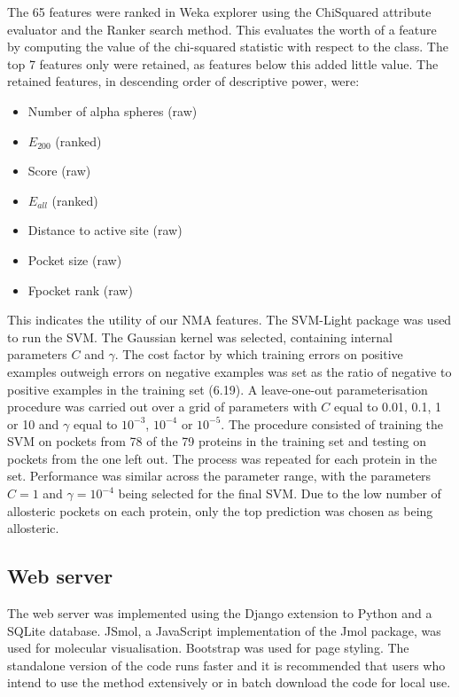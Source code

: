 The 65 features were ranked in Weka explorer \cite{Frank2004} using the ChiSquared attribute evaluator and the Ranker search method.
This evaluates the worth of a feature by computing the value of the chi-squared statistic with respect to the class.
The top 7 features only were retained, as features below this added little value.
The retained features, in descending order of descriptive power, were:
\begin{itemize}
\item Number of alpha spheres (raw)
\item $E_{200}$ (ranked)
\item Score (raw)
\item $E_{all}$ (ranked)
\item Distance to active site (raw)
\item Pocket size (raw)
\item Fpocket rank (raw)
\end{itemize}

This indicates the utility of our NMA features.
The SVM-Light package \cite{Joachims1998} was used to run the SVM.
The Gaussian kernel was selected, containing internal parameters $C$ and $\gamma$.
The cost factor by which training errors on positive examples outweigh errors on negative examples was set as the ratio of negative to positive examples in the training set (6.19).
A leave-one-out parameterisation procedure was carried out over a grid of parameters with $C$ equal to 0.01, 0.1, 1 or 10 and $\gamma$ equal to $10^{-3}$, $10^{-4}$ or $10^{-5}$.
The procedure consisted of training the SVM on pockets from 78 of the 79 proteins in the training set and testing on pockets from the one left out.
The process was repeated for each protein in the set.
Performance was similar across the parameter range, with the parameters $C=1$ and $\gamma=10^{-4}$ being selected for the final SVM.
Due to the low number of allosteric pockets on each protein, only the top prediction was chosen as being allosteric.


\subsection{Web server}

The web server was implemented using the Django extension to Python and a SQLite database.
JSmol, a JavaScript implementation of the Jmol package, was used for molecular visualisation.
Bootstrap was used for page styling.
The standalone version of the code runs faster and it is recommended that users who intend to use the method extensively or in batch download the code for local use.


